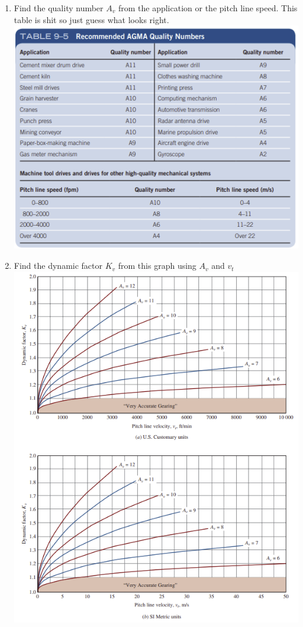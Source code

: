 \documentclass[11pt, fleqn]{article}
\begin{document}
\begin{enumerate}
    \item Find the quality number $A_v$ from the application or the pitch line speed. This table is shit so just guess what looks right.\\
    \includegraphics[scale=1]{Gears/9-5.png}
    \item Find the dynamic factor $K_v$ from this graph using $A_v$ and $v_t$\\
    \includegraphics[scale=1]{Gears/Fig 9-16.png}

\end{enumerate}
\end{document}
